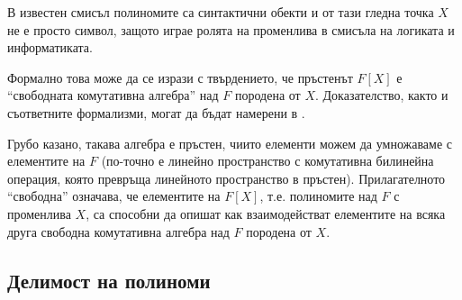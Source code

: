 \documentclass{../../common/topic}
\begin{document}
\begin{remark}\label{rem:polynomials_as_syntax}
  В известен смисъл полиномите са синтактични обекти и от тази гледна точка \( X \) не е просто символ, защото играе ролята на променлива в смисъла на логиката и информатиката.

  Формално това може да се изрази с твърдението, че пръстенът \( F[X] \) е \enquote{свободната комутативна алгебра} над \( F \) породена от \( X \). Доказателство, както и съответните формализми, могат да бъдат намерени в \cite[теорема 1-3.25]{Rotman2015AlgebraVol1}.

  Грубо казано, такава алгебра е пръстен, чиито елементи можем да умножаваме с елементите на \( F \) (по-точно е линейно пространство с комутативна билинейна операция, която превръща линейното пространство в пръстен). Прилагателното \enquote{свободна} означава, че елементите на \( F[X] \), т.е. полиномите над \( F \) с променлива \( X \), са способни да опишат как взаимодействат елементите на всяка друга свободна комутативна алгебра над \( F \) породена от \( X \).
\end{remark}

\subsection{Делимост на полиноми}
\end{document}
